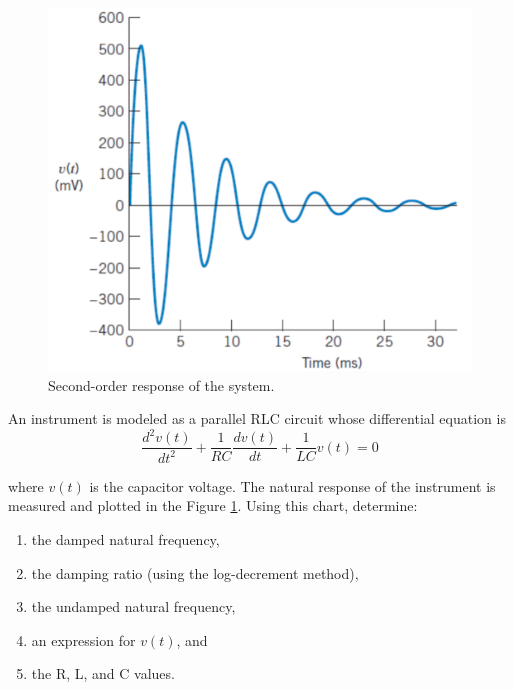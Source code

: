 \documentclass[a4paper,11pt,dvipsnames]{book}
\begin{document}
\begin{question}[subtitle=Midterm 2017]
\begin{figure}[h!]\label{fig:problem1}
\centering
  \includegraphics[width=0.7\linewidth]{problem1}
  \caption{Second-order response of the system.} 
\end{figure}
An instrument is modeled as a parallel RLC circuit whose differential equation is 
\begin{equation*}
\frac{d^2 v(t)}{dt^2} + \frac{1}{RC}\frac{dv(t)}{dt} + \frac{1}{LC}v(t) = 0
\end{equation*}

where $v(t)$ is the capacitor voltage.
The natural response of the instrument is measured
and plotted in the Figure \ref{fig:problem1}. Using this chart, determine:
\begin{enumerate}
\item the damped natural frequency,
\item the damping ratio (using the log-decrement method),
\item the undamped natural frequency,
\item an expression for $v(t)$, and
\item the R, L, and C values.
\end{enumerate}

\examspace*{50em}

\end{question}
\begin{solution}
\end{solution}
\end{document}
